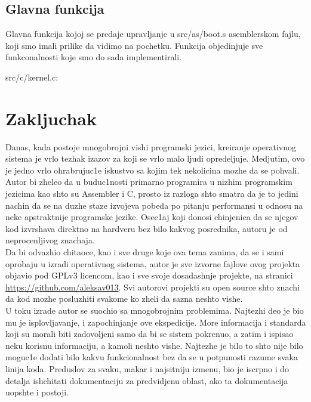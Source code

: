 \documentclass[a4paper,fleqn,12pt]{JMThesis}
\newcommand\eng{\fontencoding{OT1}\fontfamily{\rmdefault}\selectfont}
\newcommand\srb{\fontencoding{OT2}\fontfamily{\rmdefault}\selectfont}
\begin{document}
\section{Glavna funkcija}
\medskip

Glavna funkcija kojoj se predaje upravljanje u {\eng src/as/boot.s}
asemblerskom fajlu, koji smo imali prilike da vidimo na pochetku. Funkcija
objedinjuje sve funkconalnosti koje smo do sada implementirali.

{\eng src/c/kernel.c}:

\medskip\begin{minipage}{\textwidth}\eng\srb\end{minipage}\smallskip


\chapter{Zakljuchak}

Danas, kada postoje mnogobrojni vishi programski jezici, kreiranje operativnog
sistema je vrlo tezhak izazov za koji se vrlo malo ljudi opredeljuje. Medjutim,
ovo je jedno vrlo ohrabrujuc1e iskustvo sa kojim tek nekolicina mozhe da se
pohvali. Autor bi zheleo da u buduc1nosti primarno programira u nizhim
programskim jezicima kao shto su {\eng Assembler} i {\eng C}, prosto iz razloga
shto smatra da je to jedini nachin da se na duzhe staze izvojeva pobeda po
pitanju performansi u odnosu na neke apstraktnije programske jezike. Osec1aj
koji donosi chinjenica da se njegov kod izvrshava direktno na hardveru bez bilo
kakvog posrednika, autoru je od neprocenljivog znachaja.\\

Da bi odvazhio chitaoce, kao i sve druge koje ova tema zanima, da se i sami
oprobaju u izradi operativnog sistema, autor je sve izvorne fajlove ovog
projekta objavio pod {\eng GPLv3} licencom, kao i sve svoje dosadashnje
projekte, na stranici {\eng\url{https://github.com/aleksav013}}. Svi autorovi
projekti su {\eng open source} shto znachi da kod mozhe posluzhiti svakome ko
zheli da sazna neshto vishe.\\

U toku izrade autor se suochio sa mnogobrojnim problemima. Najtezhi deo je bio
mu je isplovljavanje, i zapochinjanje ove ekspedicije. More informacija i
standarda koji su morali biti zadovoljeni samo da bi se sistem pokrenuo, a
zatim i ispisao neku korisnu informaciju, a kamoli neshto vishe. Najtezhe je
bilo to shto nije bilo moguc1e dodati bilo kakvu funkcionalnost bez da se u
potpunosti razume svaka linija koda. Preduslov za svaku, makar i najsitniju
izmenu, bio je iscrpno i do detalja ish\/chitati dokumentaciju za predvidjenu
oblast, ako ta dokumentacija uopshte i postoji.\\
\end{document}
